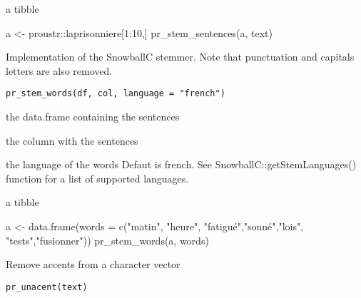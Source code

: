 \documentclass[a4paper]{book}
\begin{document}
%
\begin{Value}
a tibble
\end{Value}
%
\begin{Examples}
\begin{ExampleCode}
a <- proustr::laprisonniere[1:10,]
pr_stem_sentences(a, text)

\end{ExampleCode}
\end{Examples}
%
\begin{Description}\relax
Implementation of the SnowballC stemmer. Note that punctuation and capitals letters 
are also removed.
\end{Description}
%
\begin{Usage}
\begin{verbatim}
pr_stem_words(df, col, language = "french")
\end{verbatim}
\end{Usage}
%
\begin{Arguments}
\begin{ldescription}
\item[\code{df}] the data.frame containing the sentences

\item[\code{col}] the column with the sentences

\item[\code{language}] the language of the words Defaut is french. See SnowballC::getStemLanguages() function for a list of supported languages.
\end{ldescription}
\end{Arguments}
%
\begin{Value}
a tibble
\end{Value}
%
\begin{Examples}
\begin{ExampleCode}
a <- data.frame(words = c("matin", "heure", "fatigué","sonné","lois", "tests","fusionner"))
pr_stem_words(a, words)

\end{ExampleCode}
\end{Examples}
%
\begin{Description}\relax
Remove accents from a character vector
\end{Description}
%
\begin{Usage}
\begin{verbatim}
pr_unacent(text)
\end{verbatim}
\end{Usage}
\end{document}
